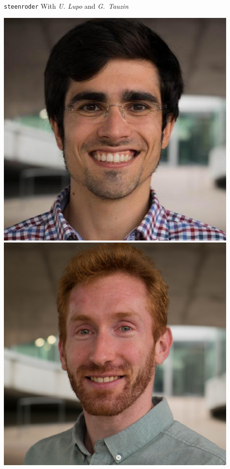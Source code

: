 %	

\begin{frame}{\texttt{steenroder}}
	\pause
	With \textit{U. Lupo} and \textit{G.~Tauzin}

	\begin{center}
		\includegraphics[scale=.2]{aux/umberto}
		\qquad
		\includegraphics[scale=.2]{aux/guillaume}
	\end{center}


\end{frame}
